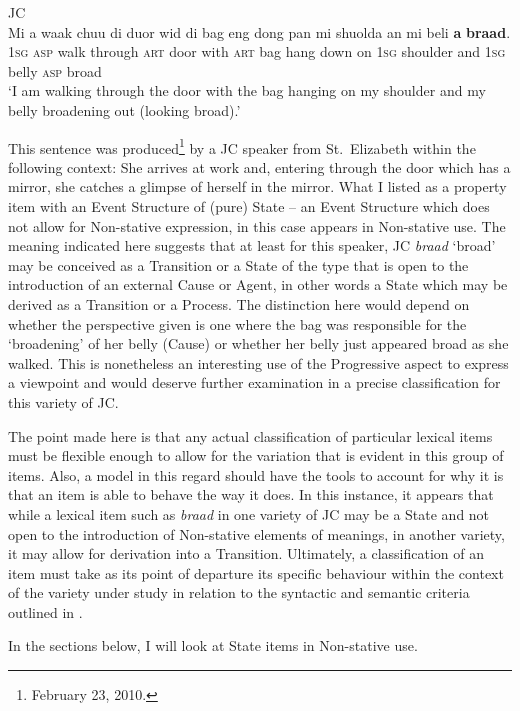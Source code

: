 \ea%
 \label{ex:5:19}
 JC\\
\gll Mi a waak chuu di duor wid di bag eng dong pan mi shuolda an mi beli   \textbf{a} \textbf{braad}.\\
 \textsc{1sg} \textsc{asp} walk through \textsc{art} door with \textsc{art} bag hang down on \textsc{1sg} shoulder and \textsc{1sg} belly  \textsc{asp} broad\\
\glt `I am walking through the door with the bag hanging on my shoulder and my belly broadening out (looking broad).'
 \z

This sentence was produced\footnote{February 23, 2010.} by a JC speaker from St.\ Elizabeth within the following context: She arrives at work and, entering through the door which has a mirror, she catches a glimpse of herself in the mirror. What I listed as a property item with an Event Structure of (pure) State – an Event Structure which does not allow for Non-stative expression, in this case appears in Non-stative use. The meaning indicated here suggests that at least for this speaker, JC \textit{braad} `broad' may be conceived as a Transition or a State of the type that is open to the introduction of an external Cause or Agent, in other words a State which may be derived as a Transition or a Process. The distinction here would depend on whether the perspective given is one where the bag was responsible for the `broadening' of her belly (Cause) or whether her belly just appeared broad as she walked. This is nonetheless an interesting use of the Progressive aspect to express a viewpoint and would deserve further examination in a precise classification for this variety of JC.


The point made here is that any actual classification of particular lexical items must be flexible enough to allow for the variation that is evident in this group of items. Also, a model in this regard should have the tools to account for why it is that an item is able to behave the way it does. In this instance, it appears that while a lexical item such as \textit{braad} in one variety of JC may be a State and not open to the introduction of Non-stative elements of meanings, in another variety, it may allow for derivation into a Transition. Ultimately, a classification of an item must take as its point of departure its specific behaviour within the context of the variety under study in relation to the syntactic and semantic criteria outlined in . 

In the sections below, I will look at State items in Non-stative use. 

